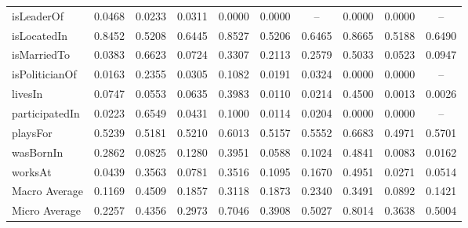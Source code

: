 \begin{table}[htbp]
\begin{center}
\begin{tabular}{|l||c|c|c||c|c|c||c|c|c|}
isLeaderOf & 0.0468 & 0.0233 & 0.0311 & 0.0000 & 0.0000 & -- & 0.0000 & 0.0000 & -- \\
isLocatedIn & 0.8452 & 0.5208 & 0.6445 & 0.8527 & 0.5206 & 0.6465 & 0.8665 & 0.5188 & 0.6490 \\
isMarriedTo & 0.0383 & 0.6623 & 0.0724 & 0.3307 & 0.2113 & 0.2579 & 0.5033 & 0.0523 & 0.0947 \\
isPoliticianOf & 0.0163 & 0.2355 & 0.0305 & 0.1082 & 0.0191 & 0.0324 & 0.0000 & 0.0000 & -- \\
livesIn & 0.0747 & 0.0553 & 0.0635 & 0.3983 & 0.0110 & 0.0214 & 0.4500 & 0.0013 & 0.0026 \\
participatedIn & 0.0223 & 0.6549 & 0.0431 & 0.1000 & 0.0114 & 0.0204 & 0.0000 & 0.0000 & -- \\
playsFor & 0.5239 & 0.5181 & 0.5210 & 0.6013 & 0.5157 & 0.5552 & 0.6683 & 0.4971 & 0.5701 \\
wasBornIn & 0.2862 & 0.0825 & 0.1280 & 0.3951 & 0.0588 & 0.1024 & 0.4841 & 0.0083 & 0.0162 \\
worksAt & 0.0439 & 0.3563 & 0.0781 & 0.3516 & 0.1095 & 0.1670 & 0.4951 & 0.0271 & 0.0514 \\
\hline
Macro Average & 0.1169 & 0.4509 & 0.1857 & 0.3118 & 0.1873 & 0.2340 & 0.3491 & 0.0892 & 0.1421 \\
Micro Average & 0.2257 & 0.4356 & 0.2973 & 0.7046 & 0.3908 & 0.5027 & 0.8014 & 0.3638 & 0.5004 \\
\hline
\end{tabular}
\end{center}
\end{table}

